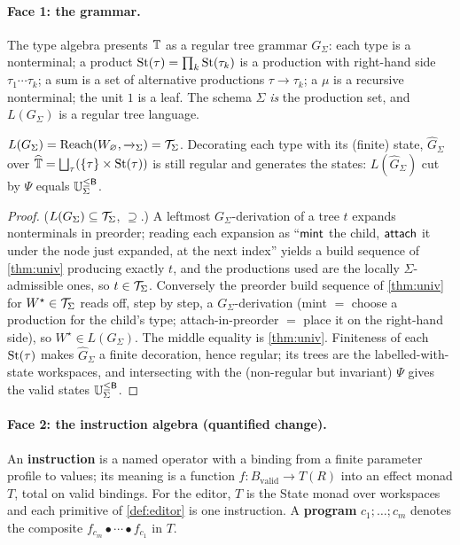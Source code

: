 \documentclass[../uxoxo-main]{subfiles}
\begin{document}
\paragraph{Face 1: the grammar.}
\begin{proposition}\label{prop:rtg}
The type algebra presents $\mathbb{T}$ as a regular tree grammar $G_\Sigma$: each
type is a nonterminal; a product $\mathrm{St}(\tau)=\prod_k\mathrm{St}(\tau_k)$ is a production
with right-hand side $\tau_1\cdots\tau_k$; a sum is a set of alternative
productions $\tau\to\tau_k$; a $\mu$ is a recursive nonterminal; the unit $1$ is
a leaf. The schema $\Sigma$ \emph{is} the production set, and $L(G_\Sigma)$ is a
regular tree language.
\end{proposition}

\begin{theorem}[Grammar $=$ reachable set]\label{thm:lang}
$L(G_\Sigma)=\operatorname{Reach}(W_{\varnothing},\xrightarrow{\,\,}_\Sigma)=\mathcal{T}_\Sigma$. Decorating each type
with its (finite) state, $\widehat{G}_\Sigma$ over
$\widehat{\mathbb{T}}=\bigsqcup_\tau(\{\tau\}\times\mathrm{St}(\tau))$ is still regular and
generates the states: $L(\widehat{G}_\Sigma)$ cut by $\Psi$ equals $\mathbb{U}_{\Sigma}^{\le \mathsf{B}}$.
\end{theorem}

\begin{proof}
($L(G_\Sigma)\subseteq\mathcal{T}_\Sigma$, $\supseteq$.) A leftmost $G_\Sigma$-derivation
of a tree $t$ expands nonterminals in preorder; reading each expansion as ``$\mathsf{mint}$
the child, $\mathsf{attach}$ it under the node just expanded, at the next index'' yields a
build sequence of \cref{thm:univ} producing exactly $t$, and the productions used
are the locally $\Sigma$-admissible ones, so $t\in\mathcal{T}_\Sigma$. Conversely the
preorder build sequence of \cref{thm:univ} for $W^\star\in\mathcal{T}_\Sigma$ reads off,
step by step, a $G_\Sigma$-derivation (mint $=$ choose a production for the child's
type; attach-in-preorder $=$ place it on the right-hand side), so
$W^\star\in L(G_\Sigma)$. The middle equality is \cref{thm:univ}. Finiteness of
each $\mathrm{St}(\tau)$ makes $\widehat{G}_\Sigma$ a finite decoration, hence regular;
its trees are the labelled-with-state workspaces, and intersecting with the
(non-regular but invariant) $\Psi$ gives the valid states $\mathbb{U}_{\Sigma}^{\le \mathsf{B}}$.
\end{proof}

\paragraph{Face 2: the instruction algebra (quantified change).}
An \textbf{instruction} is a named operator with a binding from a finite
parameter profile to values; its meaning is a function
$f:B_{\mathrm{valid}}\to T(R)$ into an effect monad $T$, total on valid bindings.
For the editor, $T$ is the State monad over workspaces and each primitive of
\cref{def:editor} is one instruction. A \textbf{program} $c_1;\dots;c_m$ denotes
the composite $f_{c_m}\bullet\cdots\bullet f_{c_1}$ in $T$.
\end{document}
